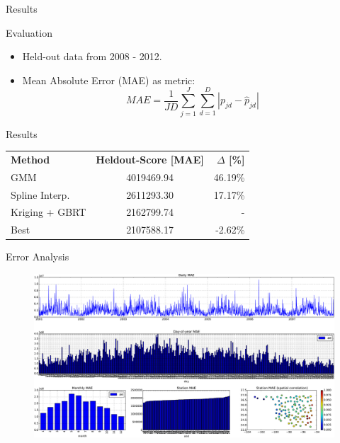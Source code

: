 \documentclass[handout]{beamer}
\begin{document}

\begin{frame}{Results}
  \begin{block}{Evaluation}
      \begin{itemize}
          \item Held-out data from 2008 - 2012.
          \item Mean Absolute Error (MAE) as metric:\\
$${MAE} = \frac{1}{JD} \sum_{j=1}^{J} \sum_{d=1}^{D} | p_{jd} - \hat{p}_{jd} | $$
      \end{itemize}
  \end{block}
  \begin{block}{Results}
        \vspace*{0.4cm}
        \begin{tabular}{ l c r }
          \textbf{Method} & \textbf{Heldout-Score [MAE]} & \textbf{$\Delta$ [\%]} \\
          GMM & 4019469.94 & 46.19\% \\
          Spline Interp. & 2611293.30 & 17.17\% \\
          Kriging + GBRT & 2162799.74 & - \\
          Best & 2107588.17 & -2.62\% \\
        \end{tabular}
  \end{block}
\end{frame}


\begin{frame}{Error Analysis}

\begin{figure}
    \centering
    \hspace*{-0.9cm}
    \includegraphics[width=1.15\textwidth]{images/hk_11_err1.pdf}
\end{figure}


\end{frame}
\end{document}

